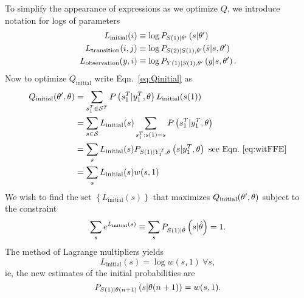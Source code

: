 To simplify the appearance of expressions as we optimize $Q$, we
introduce notation for logs of parameters
\begin{align}
  L_{\text{initial}}(i) & \equiv \log P_{{S}{(1)}|\theta'}
  \left(s|\theta' \right) \\
  L_{\text{transition}}(i,j) &\equiv \log P_{{S}{(2)} |
    {S}{(1)},\theta'}({\tilde s}|s,\theta') \\
  \label{eq:Loutput}
  L_{\text{observation}}(y,i) & \equiv \log
  P_{{Y}{(1)}|{S}{(1)},\theta'} \left(y|s,\theta' \right).
\end{align}
Now to optimize $Q_{\text{initial}}$ write Eqn.~\eqref{eq:Qinitial} as
\begin{align}
  Q_{\text{initial}} (\parameters',\parameters) &=
  \sum_{\ts{s}{1}{T}\in\states^T} P
  \left(\ts{s}{1}{T}|\ts{y}{1}{T},\parameters \right)
  L_{\text{initial}}(\ti{s}{1})\\
  &= \sum_{s \in \states} L_{\text{initial}}(s)
  \sum_{\ts{s}{1}{T}:\ti{s}{1}=s} P
  \left(\ts{s}{1}{T}|\ts{y}{1}{T},\parameters \right)\\
  &= \sum_s L_{\text{initial}}(s) P_{\ti{S}{1}|\ts{Y}{1}{T},\parameters}
  \left(s|\ts{y}{1}{T},\parameters \right) \text{ see Eqn.~\eqref{eq:witFFE}}\\
  &= \sum_s L_{\text{initial}}(s) w(s,1)
\end{align}
We wish to find the set $\left\{ L_{\text{initial}}(s) \right\}$ that
maximizes $Q_{\text{initial}} (\theta',\theta)$ subject to the
constraint
\begin{equation*}
  \sum_s e^{ L_{\text{initial}}(s)} \equiv\sum_s
  P_{{S}{(1)}|\hat {\theta}} \left(s|\hat {\theta} \right) = 1.
\end{equation*}
The method of Lagrange multipliers yields
\begin{equation}
  \label{eq:LiSol}
   L_{\text{initial}}(s) = \log w(s,1) ~ \forall s,
\end{equation}
ie, the new estimates of the initial probabilities are
\begin{equation}
  \label{eq:InitialRe}
  P_{{S}{(1)}|{\theta}{(n+1)}} \left(s|{\theta}{(n+1)} \right) = w(s,1).
\end{equation}

